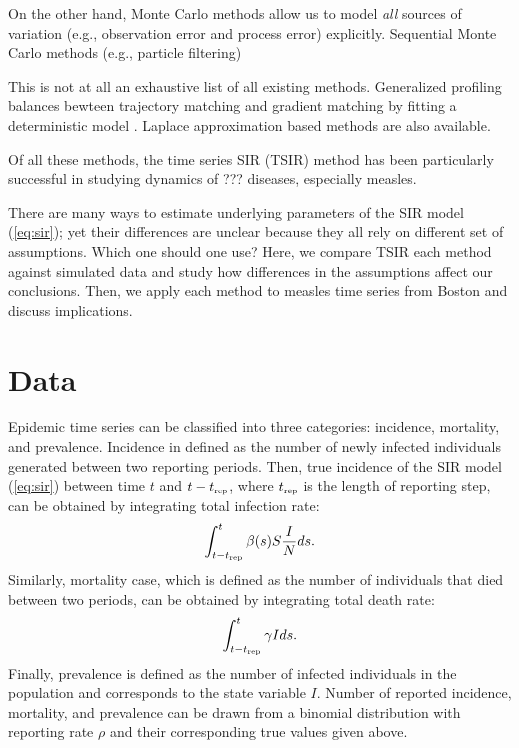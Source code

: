 \documentclass{article}
\newcommand{\eref}[1]{(\ref{eq:#1})}
\newcommand{\tsub}[2]{#1_{{\textrm{\tiny #2}}}}
\begin{document}
On the other hand, Monte Carlo methods allow us to model \emph{all} sources of variation (e.g., observation error and process error) explicitly.
Sequential Monte Carlo methods (e.g., particle filtering)


This is not at all an exhaustive list of all existing methods.
Generalized profiling balances bewteen trajectory matching and gradient matching by fitting a deterministic model  \citep{hooker2010parameterizing}.
Laplace approximation based methods are also available.

Of all these methods, the time series SIR (TSIR) method has been particularly successful in studying dynamics of ??? diseases, especially measles.




There are many ways to estimate underlying parameters of the SIR model \eref{sir};
yet their differences are unclear because they all rely on different set of assumptions.
Which one should one use?
Here, we compare TSIR each method against simulated data and study how differences in the assumptions affect our conclusions.
Then, we apply each method to measles time series from Boston and discuss implications.

\pagebreak

\section{Data}

Epidemic time series can be classified into three categories: incidence, mortality, and prevalence.
Incidence in defined as the number of newly infected individuals generated between two reporting periods.
Then, true incidence of the SIR model \eref{sir} between time $t$ and $t-\tsub{t}{rep}$, where $\tsub{t}{rep}$ is the length of reporting step, can be obtained by integrating total infection rate:
\begin{equation}
\int_{t-\tsub{t}{rep}}^{t} \beta(s) S \frac{I}{N} ds.
\end{equation}
Similarly, mortality case, which is defined as the number of individuals that died between two periods, can be obtained by integrating total death rate:
\begin{equation}
\int_{t-\tsub{t}{rep}}^{t} \gamma I ds.
\end{equation}
Finally, prevalence is defined as the number of infected individuals in the population and corresponds to the state variable $I$.
Number of reported incidence, mortality, and prevalence can be drawn from a binomial distribution with reporting rate $\rho$ and their corresponding true values given above.
\end{document}
